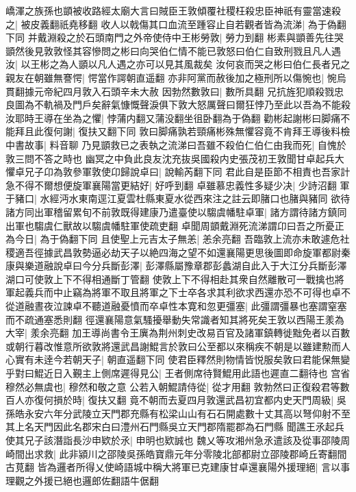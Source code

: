嶠渾之族孫也顗被收路經太廟大言曰賊臣王敦傾覆社稷枉殺忠臣神祇有靈當速殺之|{
	被皮義翻祇堯移翻}
收人以戟傷其口血流至踵容止自若觀者皆為流涕|{
	為于偽翻下同}
并戴淵殺之於石頭南門之外帝使侍中王彬勞敦|{
	勞力到翻}
彬素與顗善先往哭顗然後見敦敦怪其容慘問之彬曰向哭伯仁情不能已敦怒曰伯仁自致刑戮且凡人遇汝|{
	以王彬之為人顗以凡人遇之亦可以見其風裁矣}
汝何哀而哭之彬曰伯仁長者兄之親友在朝雖無謇愕|{
	愕當作諤朝直遥翻}
亦非阿黨而赦後加之極刑所以傷惋也|{
	惋烏貫翻據元帝紀四月敦入石頭辛未大赦}
因勃然數敦曰|{
	數所具翻}
兄抗旌犯順殺戮忠良圖為不軌禍及門戶矣辭氣慷慨聲淚俱下敦大怒厲聲曰爾狂悖乃至此以吾為不能殺汝耶時王導在坐為之懼|{
	悖蒲内翻又蒲没翻坐徂卧翻為于偽翻}
勸彬起謝彬曰脚痛不能拜且此復何謝|{
	復扶又翻下同}
敦曰脚痛孰若頸痛彬殊無懼容竟不肯拜王導後料檢中書故事|{
	料音聊}
乃見顗救已之表執之流涕曰吾雖不殺伯仁伯仁由我而死|{
	自愧於敦三問不答之時也}
幽冥之中負此良友沈充抜吳國殺内史張茂初王敦聞甘卓起兵大懼卓兄子卬為敦參軍敦使卬歸說卓曰|{
	說輸芮翻下同}
君此自是臣節不相責也吾家計急不得不爾想便旋軍襄陽當更結好|{
	好呼到翻}
卓雖慕忠義性多疑少决|{
	少詩沼翻}
軍于豬口|{
	水經沔水東南逕江夏雲杜縣東夏水從西來注之註云即䐗口也䐗與豬同}
欲待諸方同出軍稽留累旬不前敦既得建康乃遣臺使以騶虞幡駐卓軍|{
	諸方謂待諸方鎮同出軍也騶虞仁獸故以騶虞幡駐軍使疏吏翻}
卓聞周顗戴淵死流涕謂卬曰吾之所憂正為今日|{
	為于偽翻下同}
且使聖上元吉太子無恙|{
	恙余亮翻}
吾臨敦上流亦未敢遽危社稷適吾徑據武昌敦勢逼必劫天子以絶四海之望不如還襄陽更思後圖即命旋軍都尉秦康與樂道融說卓曰今分兵斷彭澤|{
	彭澤縣屬豫章郡彭蠡湖自此入于大江分兵斷彭澤湖口可使敦上下不得相通斷丁管翻}
使敦上下不得相赴其衆自然離散可一戰擒也將軍起義兵而中止竊為將軍不取且將軍之下士卒各求其利欲求西還亦恐不可得也卓不從道融晝夜泣諫卓不聽道融憂憤而卒卓性本寛和忽更彊塞|{
	此彊謂彊暴也塞謂窒塞而不疏通塞悉則翻}
徑還襄陽意氣騷擾舉動失常識者知其將死矣王敦以西陽王羕為大宰|{
	羕余亮翻}
加王導尚書令王廙為荆州刺史改易百官及諸軍鎮轉徙黜免者以百數或朝行暮改惟意所欲敦將還武昌謝鯤言於敦曰公至都以來稱疾不朝是以雖建勲而人心實有未逹今若朝天子|{
	朝直遥翻下同}
使君臣釋然則物情皆悦服矣敦曰君能保無變乎對曰鯤近日入覲主上側席遲得見公|{
	王者側席待賢鯤用此語也遲直二翻待也}
宫省穆然必無虞也|{
	穆然和敬之意}
公若入朝鯤請侍從|{
	從才用翻}
敦勃然曰正復殺君等數百人亦復何損於時|{
	復扶又翻}
竟不朝而去夏四月敦還武昌初宜都内史天門周級|{
	吳孫皓永安六年分武陵立天門郡充縣有松梁山山有石石開處數十丈其高以弩仰射不至其上名天門因此名郡宋白曰澧州石門縣吳立天門郡隋罷郡為石門縣}
聞譙王氶起兵使其兄子該潛詣長沙申欵於氶|{
	申明也欵誠也}
魏乂等攻湘州急氶遣該及從事邵陵周崎間出求救|{
	此非潁川之邵陵吳孫皓寶鼎元年分零陵北部都尉立邵陵郡崎丘寄翻間古莧翻}
皆為邏者所得乂使崎語城中稱大將軍已克建康甘卓還襄陽外援理絕|{
	言以事理觀之外援已絕也邏郎佐翻語牛倨翻}

